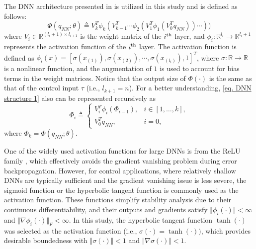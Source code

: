 \documentclass[lettersize,journal]{IEEEtran}
\begin{document}
The DNN architecture presented in \cite{RN16} is utilized in this study and is defined as follows:
\begin{equation}
    \Phi(q_{NN};\theta) \triangleq V_k^T  \phi_{k}(V_{k-1}^T   \cdots \phi_2(V_1^T   \phi_1(V_0^T   q_{NN}))\cdots ))
    \label{eq. DNN structure 1}
\end{equation}
where $V_i\in\mathbb{R}^{(l_i+1)\times l_{i+1}}$ is the weight matrix of the $i\textsuperscript{th}$ layer, and $\phi_i: \mathbb{R}^{l_i}\to\mathbb{R}^{l_i+1}$ represents the activation function of the $i\textsuperscript{th}$ layer. The activation function is defined as $\phi_i(x)=[\sigma(x_{(1)}),\sigma(x_{(2)}),\cdots, \sigma(x_{(l_{i})}), 1]^T$, where $\sigma: \mathbb{R}\to\mathbb{R}$ is a nonlinear function, and the augmentation of $1$ is used to account for bias terms in the weight matrices. Notice that the output size of $\Phi(\cdot)$ is the same as that of the control input $\tau$ (i.e., $l_{k+1}=n$). For a better understanding, \eqref{eq. DNN structure 1} also can be represented recursively as 
\begin{equation}
    \Phi_i \triangleq
    \begin{cases}
        V_i^T  \phi_i(\Phi_{i-1}), &i\in[1,\dots,k],\\
        V_0^T  q_{NN},&i=0,
    \end{cases}
    \label{eq. DNN structure 2}
\end{equation}
where $\Phi_k = \Phi(q_{NN};\theta)$.

One of the widely used activation functions for large DNNs is from the ReLU family \cite{RN27}, which effectively avoids the gradient vanishing problem during error backpropagation. However, for control applications, where relatively shallow DNNs are typically sufficient and the gradient vanishing issue is less severe, the sigmoid function or the hyperbolic tangent function is commonly used as the activation function. These functions simplify stability analysis due to their continuous differentiability, and their outputs and gradients satisfy $\Vert \phi_i(\cdot)\Vert < \infty$ and  $\Vert \nabla\phi_i(\cdot)\Vert_F < \infty$. In this study, the hyperbolic tangent function $\tanh(\cdot)$ was selected as the activation function (i.e., $\sigma(\cdot) = \tanh(\cdot))$, which provides desirable boundedness with $\Vert\sigma(\cdot)\Vert<1$ and $\Vert\nabla\sigma(\cdot)\Vert< 1$.
\end{document}
